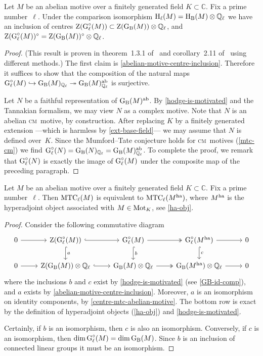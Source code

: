 \documentclass[10pt,twoside,leqno]{article}
\numberwithin{equation}{subsection}
\newcommand{\into}{\hookrightarrow}
\newcommand{\onto}{\twoheadrightarrow}
\newcommand{\QQ}{\mathbb{Q}}
\newcommand{\QQl}{\QQ_{\ell}}
\newcommand{\CC}{\mathbb{C}}
\newcommand{\ab}{\textnormal{ab}}
\newcommand{\ha}{\textnormal{ha}}
\newcommand{\HH}{\textnormal{H}}
\newcommand{\Hl}{\HH_{\ell}}
\newcommand{\HB}{\HH_{\textnormal{B}}}
\newcommand{\Mot}{\textnormal{Mot}}
\newcommand{\Zentrum}{\textnormal{Z}}
\newcommand{\GG}{\textnormal{G}}
\newcommand{\GB}{\GG_{\textnormal{B}}}
\newcommand{\Gl}{\GG_{\ell}}
\newcommand{\Glc}{\Gl^{\circ}}
\newcommand{\cm}{\textsc{cm}}
\newcommand{\MTC}{\textnormal{MTC}}
\begin{document}
\begin{lemma} %
 \label{centre-mtc-abelian-motive}
 Let $M$ be an abelian motive over
 a finitely generated field $K \subset \CC$.
 Fix a prime number~$\ell$.
 Under the comparison isomorphism $\Hl(M) = \HB(M) \otimes \QQl$
 we have an inclusion of centres
 $\Zentrum(\Glc(M)) \subset \Zentrum(\GB(M)) \otimes \QQl$, and
 $\Zentrum(\Glc(M))^\circ = \Zentrum(\GB(M))^\circ \otimes \QQl$.
 \begin{proof}
  (This result is proven in theorem~1.3.1 of~\cite{Va08}
  and corollary~2.11 of~\cite{UY13} using different methods.)
  The first claim is \cref{abelian-motive-centre-inclusion}.
  Therefore it suffices to show that the composition
  of the natural maps
  $\Glc(M) \into \GB(M)_{\QQl} \onto \GB(M)^\ab_{\QQl}$
  is surjective.

  Let $N$ be a faithful representation of $\GB(M)^\ab$.
  By \cref{hodge-is-motivated} and the Tannakian formalism,
  we may view $N$ as a complex motive.
  Note that $N$ is an abelian \cm~motive, by construction.
  After replacing $K$ by a finitely generated extension%
  ---which is harmless by \cref{ext-base-field}---%
  we may assume that $N$ is defined over~$K$.
  Since the Mumford--Tate conjecture holds for \cm~motives (\cref{mtc-cm})
  we find $\Glc(N) = \GB(N)_{\QQl} = \GB(M)^\ab_{\QQl}$.
  To complete the proof,
  we remark that $\Glc(N)$ is exactly the image of $\Glc(M)$
  under the composite map of the preceding paragraph.
 \end{proof}
\end{lemma}

\begin{proposition} %
 \label{mtc-adjoint-motive}
 Let $M$ be an abelian motive over
 a finitely generated field $K \subset \CC$.
 Fix a prime number~$\ell$.
 Then $\MTC_\ell(M)$
 is equivalent to $\MTC_\ell(M^\ha)$,
 where $M^\ha$ is the hyperadjoint object associated with $M \in \Mot_K$,
 see \cref{ha-obj}.
 \begin{proof}
  Consider the following commutative diagram
  \[
   \begin{tikzcd}
    0 \ar[r] &
    \Zentrum(\Glc(M)) \ar[r,hook] \ar[d,hook,"a"] &
    \Glc(M) \ar[r,two heads] \ar[d,hook,"b"] &
    \Glc(M^\ha) \ar[d,hook,"c"] \ar[r] &
    0 \\
    0 \ar[r] &
    \Zentrum(\GB(M)) \otimes \QQl \ar[r,hook] &
    \GB(M) \otimes \QQl \ar[r,two heads] &
    \GB(M^\ha) \otimes \QQl \ar[r] &
    0
   \end{tikzcd}
  \]
  where the inclusions $b$ and $c$ exist by \cref{hodge-is-motivated}
  (see \cref{GB-id-comp}),
  and $a$ exists by \cref{abelian-motive-centre-inclusion}.
  Moreover, $a$ is an isomorphism on identity components,
  by \cref{centre-mtc-abelian-motive}.
  The bottom row is exact by
  the definition of hyperadjoint objects (\cref{ha-obj})
  and \cref{hodge-is-motivated}.
  
  Certainly, if $b$ is an isomorphism, then $c$ is also an isomorphism.
  Conversely, if $c$ is an isomorphism,
  then $\dim \Glc(M) = \dim \GB(M)$.
  Since $b$ is an inclusion of connected linear groups
  it must be an isomorphism.
 \end{proof}
\end{proposition}
\end{document}
